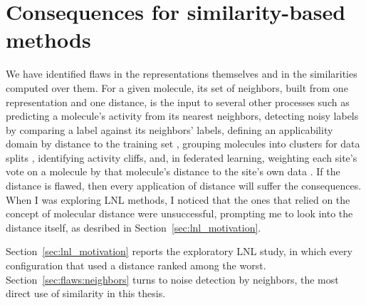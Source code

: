 \section{Consequences for similarity-based methods}\label{sec:flaws:consequences}


We have identified flaws in the representations themselves and in the similarities computed over them. For a given molecule, its set of neighbors, built from one representation and one distance, is the input to several other processes such as predicting a molecule's activity from its nearest neighbors, detecting noisy labels by comparing a label against its neighbors' labels, defining an applicability domain by distance to the training set \citep{Tropsha2010}, grouping molecules into clusters for data splits \citep{Butina1999}, identifying activity cliffs, and, in federated learning, weighting each site's vote on a molecule by that molecule's distance to the site's own data \citep{Hanser2025}. If the distance is flawed, then every application of distance will suffer the consequences. When I was exploring LNL methods, I noticed that the ones that relied on the concept of molecular distance were unsuccessful, prompting me to look into the distance itself, as desribed in  Section~\ref{sec:lnl_motivation}.

Section~\ref{sec:lnl_motivation} reports the exploratory LNL study, in which every configuration that used a distance ranked among the worst. Section~\ref{sec:flaws:neighbors} turns to noise detection by neighbors, the most direct use of similarity in this thesis. 

